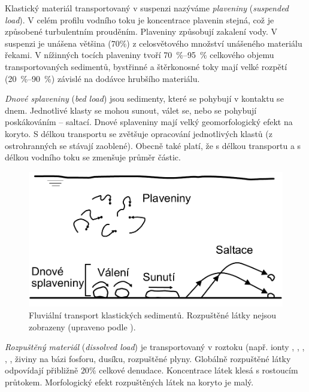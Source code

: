 Klastický materiál transportovaný v suspenzi nazýváme \emph{plaveniny} (\textit{suspended load}).  V celém profilu vodního toku je koncentrace plavenin stejná, což je způsobené turbulentním prouděním. Plaveniny způsobují zakalení vody. V suspenzi je unášena většina ($70 \%$) z celosvětového množství unášeného materiálu řekami. V nížinných tocích plaveniny tvoří \SIrange{70}{95}{\percent} celkového objemu transportovaných sedimentů, bystřinné a štěrkonosné toky mají velké rozpětí (\SIrange{20}{90}{\percent}) závislé na dodávce hrubšího materiálu. 

\emph{Dnové splaveniny} (\textit{bed load}) jsou sedimenty, které se pohybují v kontaktu se dnem. Jednotlivé klasty se mohou sunout, válet se, nebo se pohybují poskákováním -- saltací. Dnové splaveniny mají velký geomorfologický efekt na koryto. S délkou transportu se zvětšuje opracování jednotlivých klastů (z ostrohranných se stávají zaoblené). Obecně také platí, že s délkou transportu a s délkou vodního toku se zmenšuje průměr částic.

\begin{figure}
	\centering
	\includegraphics[width = 1\linewidth]{obrazky/fluvial/fluv_sed_trans}
	\caption{Fluviální transport klastických sedimentů. Rozpuštěné látky nejsou zobrazeny (upraveno podle \textcite{charltonFundamentalsFluvialGeomorphology2007}).}
	\label{fig:fluvsedtrans}
\end{figure}

\emph{Rozpuštěný materiál} (\textit{dissolved load}) je transportovaný v roztoku (např. ionty , , , , , živiny na bázi fosforu, dusíku, rozpuštěné plyny. Globálně rozpuštěné látky odpovídají přibližně $20 \%$ celkové denudace. Koncentrace látek klesá s rostoucím průtokem. Morfologický efekt rozpuštěných látek na koryto je malý. 


